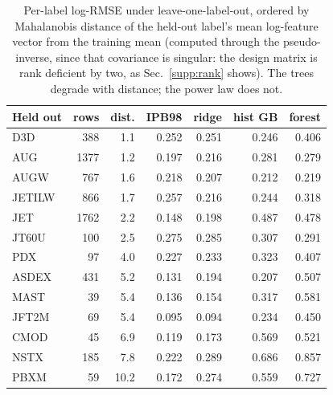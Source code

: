 \documentclass[12pt,letterpaper]{article}
\begin{document}
\begin{table}[t]
\centering
\small
\caption{Per-label log-RMSE under leave-one-label-out, ordered by Mahalanobis
distance of the held-out label's mean log-feature vector from the training
mean (computed through the pseudo-inverse, since that covariance is singular:
the design matrix is rank deficient by two, as Sec.~\ref{supp:rank} shows). The trees degrade with distance; the power law does not.}
\label{tab:permachine}
\begin{tabular}{lrrrrrr}
\toprule
Held out & rows & dist. & IPB98 & ridge & hist GB & forest \\
\midrule
D3D & 388 & 1.1 & 0.252 & 0.251 & 0.246 & 0.406 \\
AUG & 1377 & 1.2 & 0.197 & 0.216 & 0.281 & 0.279 \\
AUGW & 767 & 1.6 & 0.218 & 0.207 & 0.212 & 0.219 \\
JETILW & 866 & 1.7 & 0.257 & 0.216 & 0.244 & 0.318 \\
JET & 1762 & 2.2 & 0.148 & 0.198 & 0.487 & 0.478 \\
JT60U & 100 & 2.5 & 0.275 & 0.285 & 0.307 & 0.291 \\
PDX & 97 & 4.0 & 0.227 & 0.233 & 0.323 & 0.407 \\
ASDEX & 431 & 5.2 & 0.131 & 0.194 & 0.207 & 0.507 \\
MAST & 39 & 5.4 & 0.136 & 0.154 & 0.317 & 0.581 \\
JFT2M & 69 & 5.4 & 0.095 & 0.094 & 0.234 & 0.450 \\
CMOD & 45 & 6.9 & 0.119 & 0.173 & 0.569 & 0.521 \\
NSTX & 185 & 7.8 & 0.222 & 0.289 & 0.686 & 0.857 \\
PBXM & 59 & 10.2 & 0.172 & 0.274 & 0.559 & 0.727 \\
\bottomrule
\end{tabular}
\par\smallskip{}
\end{table}
\end{document}
